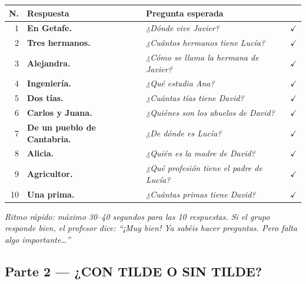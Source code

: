 \documentclass[a4paper,10pt]{article}
\renewcommand{\arraystretch}{1.3}
\begin{document}
\renewcommand{\arraystretch}{1.6}
\begin{center}
\begin{tabular}{|r|>{\bfseries}p{5cm}|p{7cm}|c|}
\hline
\rowcolor{naranja!15}
\textbf{N.} & \textbf{Respuesta} & \textbf{Pregunta esperada} & \\
\hline
1 & En Getafe. & \textit{¿Dónde vive Javier?} & $\checkmark$ \\
\hline
2 & Tres hermanos. & \textit{¿Cuántos hermanos tiene Lucía?} & $\checkmark$ \\
\hline
3 & Alejandra. & \textit{¿Cómo se llama la hermana de Javier?} & $\checkmark$ \\
\hline
4 & Ingeniería. & \textit{¿Qué estudia Ana?} & $\checkmark$ \\
\hline
5 & Dos tías. & \textit{¿Cuántas tías tiene David?} & $\checkmark$ \\
\hline
6 & Carlos y Juana. & \textit{¿Quiénes son los abuelos de David?} & $\checkmark$ \\
\hline
7 & De un pueblo de Cantabria. & \textit{¿De dónde es Lucía?} & $\checkmark$ \\
\hline
8 & Alicia. & \textit{¿Quién es la madre de David?} & $\checkmark$ \\
\hline
9 & Agricultor. & \textit{¿Qué profesión tiene el padre de Lucía?} & $\checkmark$ \\
\hline
10 & Una prima. & \textit{¿Cuántas primas tiene David?} & $\checkmark$ \\
\hline
\end{tabular}
\end{center}

\vspace{0.2cm}

\begin{tcolorbox}[colback=gris, colframe=grismedio, boxrule=0.5pt, arc=2pt]
\textit{Ritmo rápido: máximo 30--40 segundos para las 10 respuestas. Si el grupo responde bien, el profesor dice: ``¡Muy bien! Ya sabéis hacer preguntas. Pero falta algo importante\ldots''}
\end{tcolorbox}

\vspace{0.5cm}

\subsection*{\textcolor{naranja}{Parte 2 --- ¿CON TILDE O SIN TILDE?}}
\end{document}
